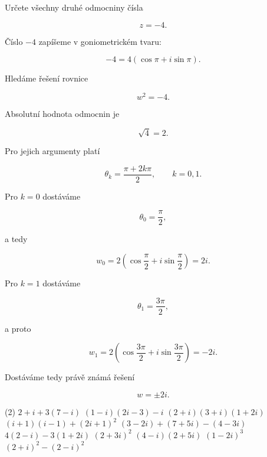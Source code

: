 \documentclass[12pt,a4paper]{article}
\begin{document}
\begin{examplebox}

Určete všechny druhé odmocniny čísla

\[
    z=-4.
\]

Číslo $-4$ zapíšeme v goniometrickém tvaru:

\[
    -4
    =
    4(\cos\pi+i\sin\pi).
\]

Hledáme řešení rovnice

\[
    w^2=-4.
\]

Absolutní hodnota odmocnin je

\[
    \sqrt{4}=2.
\]

Pro jejich argumenty platí

\[
    \theta_k
    =
    \frac{\pi+2k\pi}{2},
    \qquad
    k=0,1.
\]

Pro $k=0$ dostáváme

\[
    \theta_0
    =
    \frac{\pi}{2},
\]

a tedy

\[
    w_0
    =
    2\left(
        \cos\frac{\pi}{2}
        +
        i\sin\frac{\pi}{2}
    \right)
    =
    2i.
\]

Pro $k=1$ dostáváme

\[
    \theta_1
    =
    \frac{3\pi}{2},
\]

a proto

\[
    w_1
    =
    2\left(
        \cos\frac{3\pi}{2}
        +
        i\sin\frac{3\pi}{2}
    \right)
    =
    -2i.
\]

Dostáváme tedy právě známá řešení

\[
    w=\pm2i.
\]

\end{examplebox}




\exercisepart



\setcounter{section}{1}

\begin{exercise}
    \begin{tasks}(2)
        \task $2+i+3(7-i)$
        \task $(1-i)(2i-3)-i$
        \task $(2+i)(3+i)(1+2i)$
        \task $(i+1)(i-1)+(2i+1)^2$
        \task $(3-2i)+(7+5i)-(4-3i)$
        \task $4(2-i)-3(1+2i)$
        \task $(2+3i)^2$
        \task $(4-i)(2+5i)$
        \task $(1-2i)^3$
        \task $(2+i)^2-(2-i)^2$
    \end{tasks}
\end{exercise}
\end{document}
